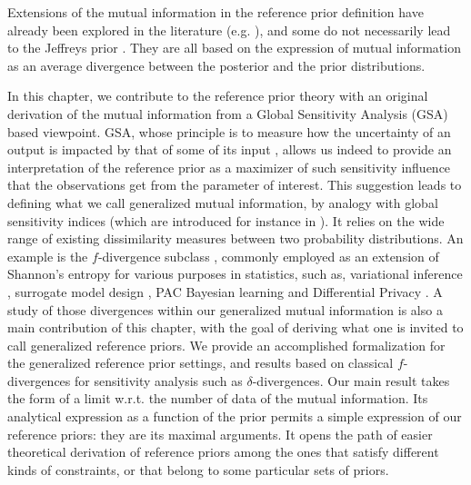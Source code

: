 Extensions of the mutual information in the reference prior definition have already been explored in the literature (e.g. \cite{chen_objective_2010,liu_divergence_2014,le_formal_2014}), and some do not necessarily lead to the Jeffreys prior \citep{hashimoto_reference_2021,clarke_reference_1997,ghosh_general_2011}. They are all based on the expression of mutual information as an average divergence between the posterior and the prior distributions.




In this chapter, we contribute to the reference prior theory with an original derivation of the mutual information from a Global Sensitivity Analysis (GSA) based viewpoint. %
GSA, whose principle is to measure how the uncertainty of an output is impacted by that of some of its input \citep{iooss_review_2015}, allows us indeed to provide %
an interpretation of the reference prior as a maximizer of such sensitivity influence that the observations get from the parameter of interest. 
This suggestion leads to defining what we call generalized mutual information, by analogy with global sensitivity indices (which are introduced for instance in \cite{da_veiga_basics_2021}). %
It relies on the wide range of existing dissimilarity measures between two probability distributions.
An example is the $f$-divergence subclass \citep{csiszar_information-type_1967}, commonly employed as an extension of  Shannon's entropy for various purposes in statistics, such as, variational inference \citep{minka_divergence_2005,bach_sum--squares_2023}, surrogate model design \citep{nguyen_surrogate_2009}, PAC Bayesian learning \citep{picard-weibel_change_2022} and Differential Privacy \citep{mironov_renyi_2017}.
%
A study of those divergences within our generalized mutual information is {also} a main contribution of this chapter, with the goal of deriving what one is invited to call generalized reference priors.
We provide an accomplished formalization for the generalized reference prior settings, and results based on classical $f$-divergences for sensitivity analysis such as $\delta$-divergences.
{
Our main result takes the form of a limit w.r.t. the number of data of the mutual information. Its analytical expression as a function of the prior permits a simple expression of our reference priors: they are its maximal arguments. It opens the path of easier {theoretical} derivation of reference priors among the ones that satisfy different kinds of constraints, or that belong to some particular sets of priors.}


